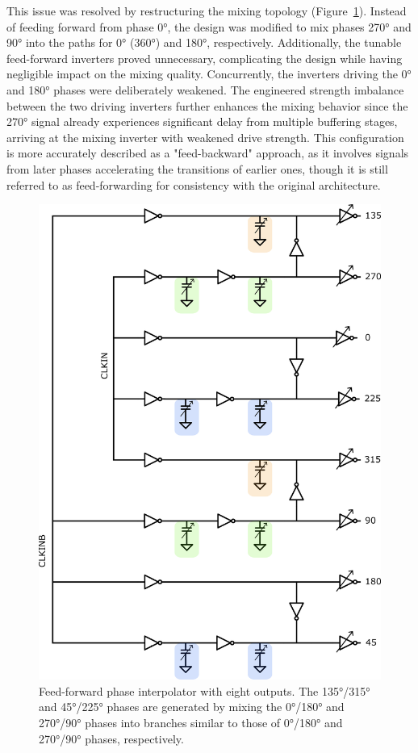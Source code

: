 This issue was resolved by restructuring the mixing topology (Figure~\ref{fig:FF_8out}). Instead of feeding forward from phase \ang{0}, the design was modified to mix phases \ang{270} and \ang{90} into the paths for \ang{0} (\ang{360}) and \ang{180}, respectively. Additionally, the tunable feed-forward inverters proved unnecessary, complicating the design while having negligible impact on the mixing quality. Concurrently, the inverters driving the \ang{0} and \ang{180} phases were deliberately weakened. The engineered strength imbalance between the two driving inverters further enhances the mixing behavior since the \ang{270} signal already experiences significant delay from multiple buffering stages, arriving at the mixing inverter with weakened drive strength. This configuration is more accurately described as a "feed-backward" approach, as it involves signals from later phases accelerating the transitions of earlier ones, though it is still referred to as feed-forwarding for consistency with the original architecture.

\begin{figure}[H]
  \centering
  \includegraphics[width=0.8\linewidth]{figures/Schematics/ff_8out.png}
  \caption{Feed-forward phase interpolator with eight outputs. The \ang{135}/\ang{315} and \ang{45}/\ang{225} phases are generated by mixing the \ang{0}/\ang{180} and \ang{270}/\ang{90} phases into branches similar to those of \ang{0}/\ang{180} and \ang{270}/\ang{90} phases, respectively.}
  \label{fig:FF_8out}
\end{figure}


